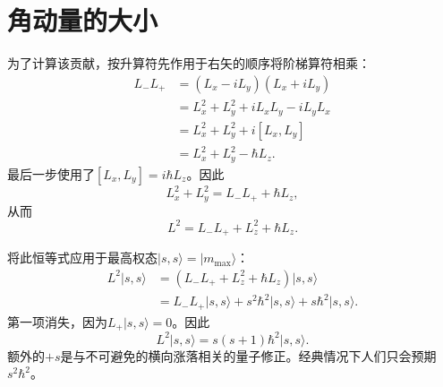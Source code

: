 \begin{classroomqa}
\end{classroomqa}

\begin{classroomqa}
\end{classroomqa}

\section{角动量的大小}

\begin{classroomqa}
\end{classroomqa}

为了计算该贡献，按升算符先作用于右矢的顺序将阶梯算符相乘：
\begin{align}
L_-L_+
&=(L_x-iL_y)(L_x+iL_y) \\
&=L_x^2+L_y^2+iL_xL_y-iL_yL_x \\
&=L_x^2+L_y^2+i[L_x,L_y] \\
&=L_x^2+L_y^2-\hbar L_z.
\end{align}
最后一步使用了\([L_x,L_y]=i\hbar L_z\)。因此
\begin{equation}
L_x^2+L_y^2=L_-L_++\hbar L_z,
\end{equation}
从而
\begin{equation}
L^2=L_-L_++L_z^2+\hbar L_z.
\end{equation}

将此恒等式应用于最高权态\(\lvert s,s\rangle=\lvert m_{\max}\rangle\)：
\begin{align}
L^2\lvert s,s\rangle
&=\left(L_-L_++L_z^2+\hbar L_z\right)\lvert s,s\rangle \\
&=L_-L_+\lvert s,s\rangle
+s^2\hbar^2\lvert s,s\rangle
+s\hbar^2\lvert s,s\rangle.
\end{align}
第一项消失，因为\(L_+\lvert s,s\rangle=0\)。因此
\begin{equation}
L^2\lvert s,s\rangle
=s(s+1)\hbar^2\lvert s,s\rangle.
\end{equation}
额外的\(+s\)是与不可避免的横向涨落相关的量子修正。经典情况下人们只会预期\(s^2\hbar^2\)。

